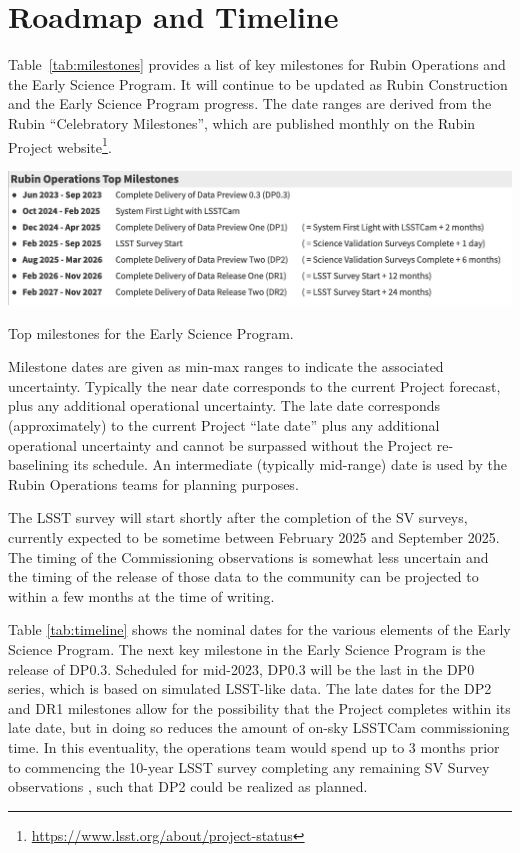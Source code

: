 \section{Roadmap and Timeline} \label{sec:timeline}

Table~\ref{tab:milestones} provides a list of key milestones for Rubin Operations and the Early Science Program.
It will continue to be updated as Rubin Construction and the Early Science Program progress. 
The date ranges are derived from the Rubin ``Celebratory Milestones'', which are  published monthly on the Rubin Project website\footnote{\url{https://www.lsst.org/about/project-status}}. 

\begin{table}[ht]
\centering
\includegraphics[width=\linewidth]{figures/DPR-milestones}
\caption{Top milestones for the Early Science Program.}
\label{tab:milestones}
\end{table}

Milestone dates are given as min-max ranges to indicate the associated uncertainty. 
Typically the near date corresponds to the current Project forecast, plus any additional operational uncertainty.
The late date corresponds (approximately) to the current Project ``late date'' plus any additional operational uncertainty and cannot be surpassed without the Project re-baselining its schedule.
An intermediate (typically mid-range) date is used by the Rubin Operations teams for planning purposes. 

The LSST survey will start shortly after the completion of the SV surveys, currently expected to be sometime between February 2025 and September 2025.
The timing of the Commissioning observations is somewhat less uncertain and the timing of the release of those data to the community can be projected to within a few months at the time of writing.

Table \ref{tab:timeline} shows the nominal  dates for the various elements of the Early Science Program. 
The next key milestone in the Early Science Program is the release of DP0.3. 
Scheduled for mid-2023, DP0.3 will be the last in the DP0 series, which is based on simulated LSST-like data. 
The late dates for the DP2 and DR1 milestones allow for the possibility that the Project completes within its late date, but in doing so reduces the amount of on-sky LSSTCam commissioning time.
In this eventuality, the operations team would spend up to 3 months prior to commencing the 10-year LSST survey completing any remaining SV Survey observations , such that DP2 could be realized as planned.

